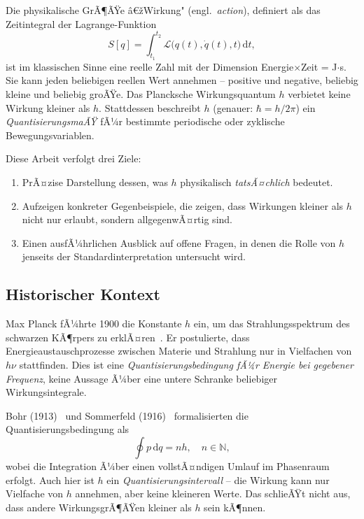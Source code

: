 ﻿\documentclass[12pt,a4paper]{article}
\theoremstyle{plain}
\theoremstyle{definition}
\theoremstyle{remark}
\newcommand{\Lagr}{\mathcal{L}}
\begin{document}
Die physikalische GrÃ¶ÃŸe â€žWirkung" (engl.\ \emph{action}), definiert als das Zeitintegral der
Lagrange-Funktion
\begin{equation}
  S[q] = \int_{t_1}^{t_2} \Lagr\!\bigl(q(t),\dot{q}(t),t\bigr)\,\mathrm{d}t,
  \label{eq:action_def}
\end{equation}
ist im klassischen Sinne eine reelle Zahl mit der Dimension Energie$\times$Zeit = J$\cdot$s. Sie kann
jeden beliebigen reellen Wert annehmen -- positive und negative, beliebig kleine und beliebig groÃŸe.
Das Plancksche Wirkungsquantum $h$ verbietet keine Wirkung kleiner als $h$. Stattdessen beschreibt
$h$ (genauer: $\hbar = h/2\pi$) ein \emph{QuantisierungsmaÃŸ} fÃ¼r bestimmte periodische
oder zyklische Bewegungsvariablen.

Diese Arbeit verfolgt drei Ziele:
\begin{enumerate}[label=(\roman*)]
  \item PrÃ¤zise Darstellung dessen, was $h$ physikalisch \emph{tatsÃ¤chlich} bedeutet.
  \item Aufzeigen konkreter Gegenbeispiele, die zeigen, dass Wirkungen kleiner als $h$
        nicht nur erlaubt, sondern allgegenwÃ¤rtig sind.
  \item Einen ausfÃ¼hrlichen Ausblick auf offene Fragen, in denen die Rolle von $h$ jenseits
        der Standardinterpretation untersucht wird.
\end{enumerate}

\subsection{Historischer Kontext}

Max Planck fÃ¼hrte 1900 die Konstante $h$ ein, um das Strahlungsspektrum des schwarzen
KÃ¶rpers zu erklÃ¤ren~\cite{planck1900}. Er postulierte, dass Energieaustauschprozesse zwischen
Materie und Strahlung nur in Vielfachen von $h\nu$ stattfinden. Dies ist eine
\emph{Quantisierungsbedingung fÃ¼r Energie bei gegebener Frequenz}, keine Aussage Ã¼ber
eine untere Schranke beliebiger Wirkungsintegrale.

Bohr (1913)~\cite{bohr1913} und Sommerfeld (1916)~\cite{sommerfeld1916} formalisierten
die Quantisierungsbedingung als
\begin{equation}
  \oint p\,\mathrm{d}q = n h, \quad n \in \mathbb{N},
  \label{eq:bohr_sommerfeld}
\end{equation}
wobei die Integration Ã¼ber einen vollstÃ¤ndigen Umlauf im Phasenraum erfolgt. Auch hier
ist $h$ ein \emph{Quantisierungsintervall} -- die Wirkung kann nur Vielfache von $h$
annehmen, aber keine kleineren Werte. Das schlieÃŸt nicht aus, dass andere WirkungsgrÃ¶ÃŸen
kleiner als $h$ sein kÃ¶nnen.
\end{document}
